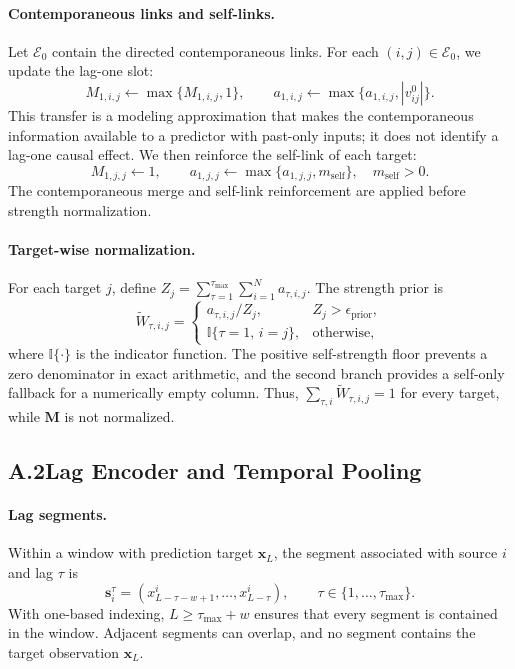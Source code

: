 \documentclass[letterpaper]{article}
\newcommand{\Wts}{\widetilde{W}}
\begin{document}
\paragraph{Contemporaneous links and self-links.}
Let $\mathcal{E}_0$ contain the directed contemporaneous links. For each $(i,j)\in\mathcal{E}_0$, we update the lag-one slot:
\begin{equation}
M_{1,i,j}\leftarrow\max\{M_{1,i,j},1\},\qquad a_{1,i,j}\leftarrow\max\{a_{1,i,j},|v^0_{ij}|\}.
\tag{A.3}
\end{equation}
This transfer is a modeling approximation that makes the contemporaneous information available to a predictor with past-only inputs; it does not identify a lag-one causal effect. We then reinforce the self-link of each target:
\begin{equation}
M_{1,j,j}\leftarrow1,\qquad a_{1,j,j}\leftarrow\max\{a_{1,j,j},m_{\mathrm{self}}\},\quad m_{\mathrm{self}}>0.
\tag{A.4}
\end{equation}
The contemporaneous merge and self-link reinforcement are applied before strength normalization.

\paragraph{Target-wise normalization.}
For each target $j$, define $Z_j=\sum_{\tau=1}^{\tau_{\max}}\sum_{i=1}^{N}a_{\tau,i,j}$. The strength prior is
\begin{equation}
\Wts_{\tau,i,j}=
\begin{cases}
a_{\tau,i,j}/Z_j, & Z_j>\epsilon_{\mathrm{prior}},\\
\mathbb{I}\{\tau=1,\,i=j\}, & \text{otherwise},
\end{cases}
\tag{A.5}
\end{equation}
where $\mathbb{I}\{\cdot\}$ is the indicator function. The positive self-strength floor prevents a zero denominator in exact arithmetic, and the second branch provides a self-only fallback for a numerically empty column. Thus, $\sum_{\tau,i}\Wts_{\tau,i,j}=1$ for every target, while $\mathbf{M}$ is not normalized.

\subsection{A.2\quad Lag Encoder and Temporal Pooling}

\paragraph{Lag segments.}
Within a window with prediction target $\mathbf{x}_L$, the segment associated with source $i$ and lag $\tau$ is
\begin{equation}
\mathbf{s}^\tau_i=(x^i_{L-\tau-w+1},\ldots,x^i_{L-\tau}),\qquad \tau\in\{1,\ldots,\tau_{\max}\}.
\tag{A.6}
\end{equation}
With one-based indexing, $L\ge\tau_{\max}+w$ ensures that every segment is contained in the window. Adjacent segments can overlap, and no segment contains the target observation $\mathbf{x}_L$.
\end{document}
